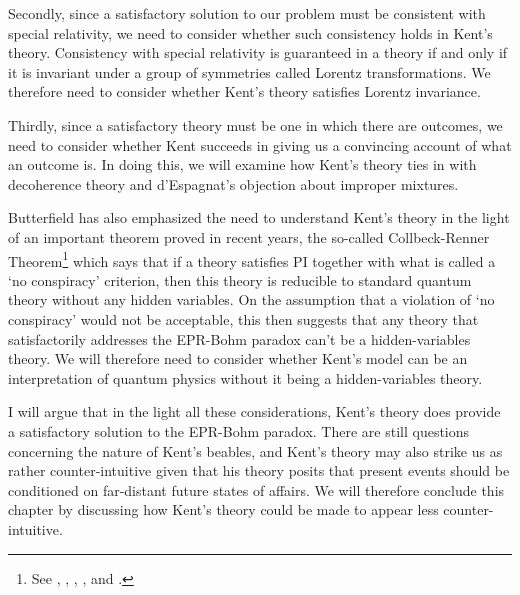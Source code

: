 Secondly, since a satisfactory solution to our problem must be consistent with special relativity, we need to consider whether such consistency holds in Kent's theory. Consistency with special relativity is guaranteed in a theory if and only if it is invariant under a group of symmetries called Lorentz transformations. We therefore need to consider whether Kent's theory satisfies Lorentz invariance. 

Thirdly, since a satisfactory theory must be one in which there are outcomes, we need to consider whether Kent succeeds in giving us a convincing account of what an outcome is. In doing this, we will examine how Kent's theory ties in with decoherence theory and d'Espagnat's objection about improper mixtures. 

Butterfield has also emphasized the need to understand Kent's theory in the light of an important theorem proved in recent years, the so-called Collbeck-Renner Theorem\footnote{See \cite{LeegwaterGijs2016Aitf}, \cite{ColbeckRoger2011Neoq}, \cite{ColbeckRoger2012Tcoq}, \cite{LandsmanK2015OtCt}, and \cite{Landsman}.} which says that if a theory satisfies PI together with what is called a `no conspiracy' criterion, then this theory is reducible to standard quantum theory without any hidden variables. On the assumption that a violation of `no conspiracy' would not be acceptable,  this then suggests that any theory that satisfactorily addresses the  EPR-Bohm paradox can't be a hidden-variables theory. We will therefore need to consider whether Kent's model can be an interpretation of quantum physics without it being a hidden-variables theory.

I will argue that in the light all these considerations, Kent's theory does provide a satisfactory solution to the EPR-Bohm paradox. There are still questions concerning the nature of Kent's beables, and Kent's theory may also strike us as rather counter-intuitive given that his theory posits that present events should be conditioned on far-distant future states of affairs. We will therefore conclude this chapter by discussing how Kent's theory could be made to appear less counter-intuitive.

